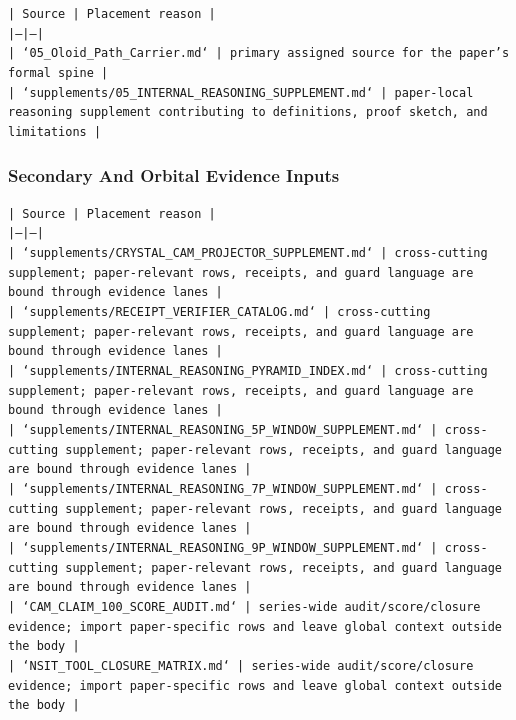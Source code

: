 \documentclass[11pt]{article}
\begin{document}
\noindent\texttt{| Source | Placement reason |}\\
\noindent\texttt{|---|---|}\\
\noindent\texttt{| `05\_Oloid\_Path\_Carrier.md` | primary assigned source for the paper's formal spine |}\\
\noindent\texttt{| `supplements/05\_INTERNAL\_REASONING\_SUPPLEMENT.md` | paper-local reasoning supplement contributing to definitions, proof sketch, and limitations |}\\

\subsubsection*{Secondary And Orbital Evidence Inputs}

\noindent\texttt{| Source | Placement reason |}\\
\noindent\texttt{|---|---|}\\
\noindent\texttt{| `supplements/CRYSTAL\_CAM\_PROJECTOR\_SUPPLEMENT.md` | cross-cutting supplement; paper-relevant rows, receipts, and guard language are bound through evidence lanes |}\\
\noindent\texttt{| `supplements/RECEIPT\_VERIFIER\_CATALOG.md` | cross-cutting supplement; paper-relevant rows, receipts, and guard language are bound through evidence lanes |}\\
\noindent\texttt{| `supplements/INTERNAL\_REASONING\_PYRAMID\_INDEX.md` | cross-cutting supplement; paper-relevant rows, receipts, and guard language are bound through evidence lanes |}\\
\noindent\texttt{| `supplements/INTERNAL\_REASONING\_5P\_WINDOW\_SUPPLEMENT.md` | cross-cutting supplement; paper-relevant rows, receipts, and guard language are bound through evidence lanes |}\\
\noindent\texttt{| `supplements/INTERNAL\_REASONING\_7P\_WINDOW\_SUPPLEMENT.md` | cross-cutting supplement; paper-relevant rows, receipts, and guard language are bound through evidence lanes |}\\
\noindent\texttt{| `supplements/INTERNAL\_REASONING\_9P\_WINDOW\_SUPPLEMENT.md` | cross-cutting supplement; paper-relevant rows, receipts, and guard language are bound through evidence lanes |}\\
\noindent\texttt{| `CAM\_CLAIM\_100\_SCORE\_AUDIT.md` | series-wide audit/score/closure evidence; import paper-specific rows and leave global context outside the body |}\\
\noindent\texttt{| `NSIT\_TOOL\_CLOSURE\_MATRIX.md` | series-wide audit/score/closure evidence; import paper-specific rows and leave global context outside the body |}\\
\end{document}
